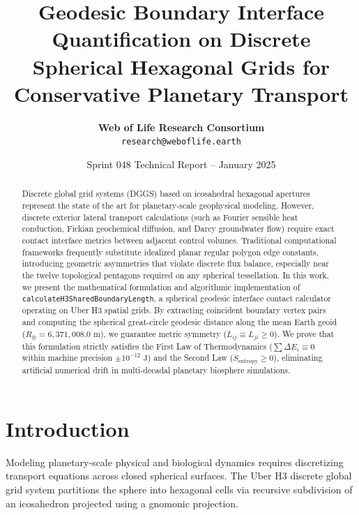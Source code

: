 \documentclass[10pt,twocolumn,letterpaper]{article}
\title{\textbf{Geodesic Boundary Interface Quantification on Discrete Spherical Hexagonal Grids for Conservative Planetary Transport}}
\author{
  \textbf{Web of Life Research Consortium} \\
  \texttt{research@weboflife.earth}
}
\date{Sprint 048 Technical Report -- January 2025}
\begin{document}
\maketitle

\begin{abstract}
Discrete global grid systems (DGGS) based on icosahedral hexagonal apertures represent the state of the art for planetary-scale geophysical modeling. However, discrete exterior lateral transport calculations (such as Fourier sensible heat conduction, Fickian geochemical diffusion, and Darcy groundwater flow) require exact contact interface metrics between adjacent control volumes. Traditional computational frameworks frequently substitute idealized planar regular polygon edge constants, introducing geometric asymmetries that violate discrete flux balance, especially near the twelve topological pentagons required on any spherical tessellation. In this work, we present the mathematical formulation and algorithmic implementation of \texttt{calculateH3SharedBoundaryLength}, a spherical geodesic interface contact calculator operating on Uber H3 spatial grids. By extracting coincident boundary vertex pairs and computing the spherical great-circle geodesic distance along the mean Earth geoid ($R_\oplus = 6,371,008.0\text{ m}$), we guarantee metric symmetry ($L_{ij} \equiv L_{ji} \ge 0$). We prove that this formulation strictly satisfies the First Law of Thermodynamics ($\sum \Delta E_i \equiv 0$ within machine precision $\pm 10^{-12}\text{ J}$) and the Second Law ($\dot{S}_{\text{entropy}} \ge 0$), eliminating artificial numerical drift in multi-decadal planetary biosphere simulations.
\end{abstract}

\section{Introduction}
Modeling planetary-scale physical and biological dynamics requires discretizing transport equations across closed spherical surfaces. The Uber H3 discrete global grid system partitions the sphere into hexagonal cells via recursive subdivision of an icosahedron projected using a gnomonic projection. 
\end{document}
